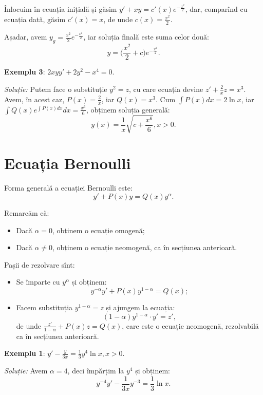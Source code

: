 Înlocuim în ecuația inițială și găsim $y' + xy = c'(x) e^{-\frac{x^2}{2}}$, dar, comparînd
cu ecuația dată, găsim $c'(x) = x$, de unde $c(x) = \frac{x^2}{2}$.

Așadar, avem $y_g = \frac{x^2}{2} e^{-\frac{x^2}{2}}$, iar soluția finală este suma celor două:
\[
  y = \Big( \frac{x^2}{2} + c \Big) e^{-\frac{x^2}{2}}.
\]

\vspace{1cm}

\textbf{Exemplu 3}: $2xyy' + 2y^2 - x^4 = 0$.

\emph{Soluție:} Putem face o substituție $y^2 = z$, cu care
ecuația devine $z' + \frac{2}{x} z = x^3$. Avem, în acest caz, $P(x) = \frac{2}{x}$,
iar $Q(x) = x^3$. Cum $\int P(x) dx = 2 \ln x$, iar $\int Q(x) e^{\int P(x) dx} dx = \frac{x^6}{6}$,
obținem soluția generală:
\[
  y(x) = \frac{1}{x} \sqrt{c + \frac{x^6}{6}}, x > 0.
\]


\section{Ecuația Bernoulli}
\label{sec:bernoulli}

Forma generală a ecuației Bernoulli este:
\[
  y' + P(x) y = Q(x) y^\alpha.
\]

Remarcăm că:
\begin{itemize}
\item Dacă $\alpha = 0$, obținem o ecuație omogenă;
\item Dacă $\alpha \neq 0$, obținem o ecuație neomogenă, ca în secțiunea anterioară.
\end{itemize}

Pașii de rezolvare sînt:
\begin{itemize}
\item Se împarte cu $y^\alpha$ și obținem:
  \[
    y^{-\alpha} y' + P(x) y^{1 - \alpha} = Q(x);
  \]
\item Facem substituția $y^{1 - \alpha} = z$ și ajungem la ecuația:
  \[
    (1 - \alpha) y^{1 - \alpha} \cdot y' = z',
\]
de unde $\frac{z'}{1 - \alpha} + P(x) z = Q(x)$, care este o ecuație
neomogenă, rezolvabilă ca în secțiunea anterioară.
\end{itemize}

\textbf{Exemplu 1}: $y' - \frac{y}{3x} = \frac{1}{3} y^4 \ln x, x > 0$.

\emph{Soluție:} Avem $\alpha = 4$, deci împărțim la $y^4$ și obținem:
\[
  y^{-4} y' - \frac{1}{3x} y^{-3} = \frac{1}{3} \ln x.
\]

